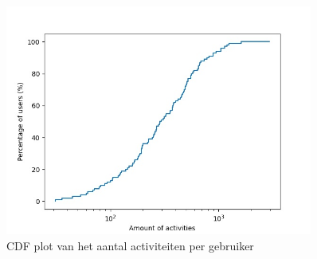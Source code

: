 \begin{figure}[h]
    \centering
    \includegraphics[width=0.9\textwidth]{fig/Afwijkingen&Analyses/CDF_amountActivities.jpg}
    \caption{CDF plot van het aantal activiteiten per gebruiker}\label{fig:cdf_amount_activities}
\end{figure}



